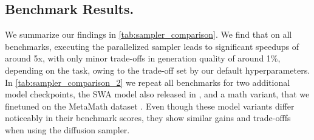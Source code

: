 \documentclass{article} %
\theoremstyle{definition}
\theoremstyle{plain}
\begin{document}
\subsection{Benchmark Results.}
We summarize our findings in \cref{tab:sampler_comparison}.
We find that on all benchmarks, executing the parallelized sampler leads to significant speedups of around 5x, with only minor trade-offs in generation quality of around 1\%, depending on the task, owing to the trade-off set by our default hyperparameters. In \cref{tab:sampler_comparison_2} we repeat all benchmarks for two additional model checkpoints, the SWA model also released in \citet{geiping_scaling_2025}, and a math variant, that we finetuned on the MetaMath dataset \citep{yu_metamath_2023}. Even though these model variants differ noticeably in their benchmark scores, they show similar gains and trade-offfs when using the diffusion sampler.




\end{document}
